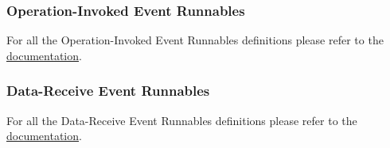 \subsubsection{Operation-Invoked Event Runnables}
For all the Operation-Invoked Event Runnables definitions please refer to the \href{doxygen/html/group___operation_invoked_event.html}{documentation}.

\subsubsection{Data-Receive Event Runnables}
For all the Data-Receive Event Runnables definitions please refer to the \href{doxygen/html/group___data_receive_event.html}{documentation}.




